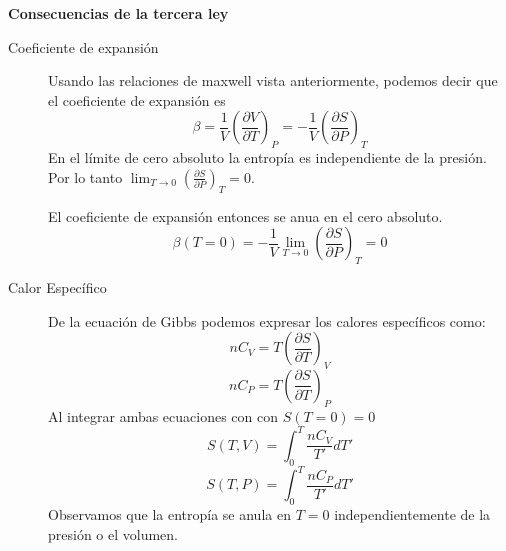 \begin{center}
\textbf{Consecuencias de la tercera ley}
\end{center}

\begin{description}
    \item[Coeficiente de expansión]{Usando las relaciones de maxwell vista anteriormente, podemos decir que el coeficiente de expansión es 
    $$\beta = \frac{1}{V}\left( \frac{\partial V}{\partial T} \right)_P=-\frac{1}{V}\left( \frac{\partial S}{\partial P} \right)_T$$
    En el límite de cero absoluto la entropía es independiente de la presión. Por lo tanto $\lim_{T\to 0} \left(\frac{\partial S}{\partial P} \right)_T=0$.
    
    El coeficiente de expansión entonces se anua en el cero absoluto.$$\beta(T=0)=-\frac{1}{V}\lim_{T\to 0} \left(\frac{\partial S}{\partial P}\right)_T = 0$$
    }
    \item[Calor Específico]{De la ecuación de Gibbs podemos expresar los calores específicos como:
    $$nC_V=T\left(\frac{\partial S}{\partial T}\right)_V$$
    $$nC_P=T\left(\frac{\partial S}{\partial T}\right)_P$$
    Al integrar ambas ecuaciones con con $S(T=0)=0$
    $$S(T,V) = \int_0^T \frac{nC_V}{T'}dT'$$
    $$S(T,P) = \int_0^T \frac{nC_P}{T'}dT'$$
    Observamos que la entropía se anula en $T=0$ independientemente de la presión o el volumen. 
    
    }
\end{description}